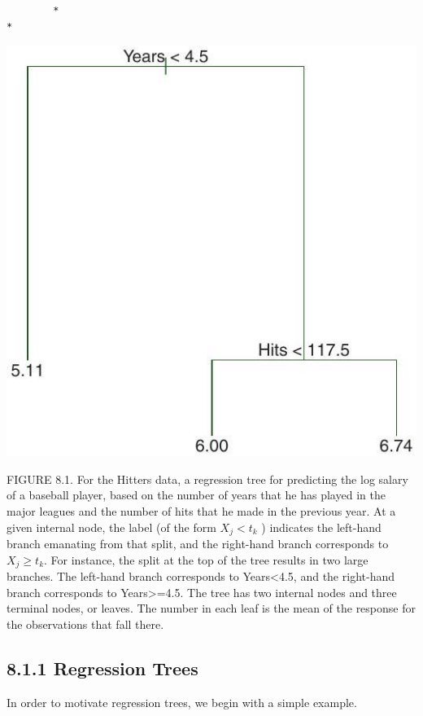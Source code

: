 \documentclass[10pt]{article}
\begin{document}
\begin{verbatim}
        *
*
\end{verbatim}

\begin{center}
\includegraphics[max width=\textwidth]{2025_05_05_efe77898333945044de4g-319}
\end{center}

FIGURE 8.1. For the Hitters data, a regression tree for predicting the log salary of a baseball player, based on the number of years that he has played in the major leagues and the number of hits that he made in the previous year. At a given internal node, the label (of the form $X_{j}<t_{k}$ ) indicates the left-hand branch emanating from that split, and the right-hand branch corresponds to $X_{j} \geq t_{k}$. For instance, the split at the top of the tree results in two large branches. The left-hand branch corresponds to Years<4.5, and the right-hand branch corresponds to Years>=4.5. The tree has two internal nodes and three terminal nodes, or leaves. The number in each leaf is the mean of the response for the observations that fall there.

\subsection*{8.1.1 Regression Trees}
In order to motivate regression trees, we begin with a simple example.
\end{document}
